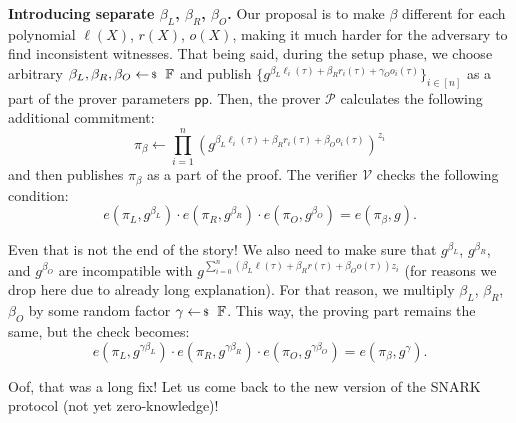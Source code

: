 \documentclass[../lecture-notes-148x210.tex]{subfiles}
\begin{document}
\textbf{Introducing separate $\beta_L$, $\beta_R$, $\beta_O$.} Our proposal is to make $\beta$ different for each polynomial $\ell(X)$, $r(X)$, $o(X)$, making it much harder for the adversary to find inconsistent witnesses. That being said, during the setup phase, we choose arbitrary $\beta_L,\beta_R,\beta_O \leftarrowS \mathbb{F}$ and publish $\{g^{\beta_L\ell_i(\tau)+\beta_Rr_i(\tau)+\gamma_Oo_i(\tau)}\}_{i \in [n]}$ as a part of the prover parameters $\mathsf{pp}$. Then, the prover $\mathcal{P}$ calculates the following additional commitment:
\begin{equation*}
    \pi_{\beta} \gets \prod_{i=1}^n (g^{\beta_L\ell_i(\tau) + \beta_Rr_i(\tau) + \beta_Oo_i(\tau)})^{z_i}
\end{equation*}
and then publishes $\pi_{\beta}$ as a part of the proof. The verifier $\mathcal{V}$ checks the following condition:
\begin{equation*}
    e(\pi_L, g^{\beta_L}) \cdot e(\pi_R, g^{\beta_R}) \cdot e(\pi_O, g^{\beta_O}) = e(\pi_{\beta}, g).
\end{equation*}

Even that is not the end of the story! We also need to make sure that $g^{\beta_L}$, $g^{\beta_R}$, and $g^{\beta_O}$ are incompatible with $g^{\sum_{i=0}^n (\beta_L\ell(\tau) + \beta_Rr(\tau) + \beta_Oo(\tau))z_i}$ (for reasons we drop here due to already long explanation). For that reason, we multiply $\beta_L$, $\beta_R$, $\beta_O$ by some random factor $\gamma \leftarrowS \mathbb{F}$. This way, the proving part remains the same, but the check becomes:
\begin{equation*}
    e(\pi_L, g^{\gamma\beta_L}) \cdot e(\pi_R, g^{\gamma\beta_R}) \cdot e(\pi_O, g^{\gamma\beta_O}) = e(\pi_{\beta}, g^{\gamma}).
\end{equation*}

Oof, that was a long fix! Let us come back to the new version of the SNARK protocol (not yet zero-knowledge)!
\end{document}
